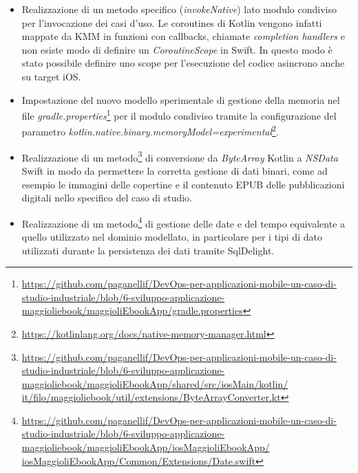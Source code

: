 \begin{itemize}
    \item Realizzazione di un metodo specifico (\textit{invokeNative}) lato modulo condiviso per l'invocazione dei casi d'uso. Le coroutines di Kotlin vengono infatti mappate da KMM in funzioni con callbacks, chiamate \textit{completion handlers} e non esiste modo di definire un \textit{CoroutineScope} in Swift. In questo modo è stato possibile definire uno scope per l'esecuzione del codice asincrono anche su target iOS.
    \item Impostazione del nuovo modello sperimentale di gestione della memoria nel file \textit{gradle.properties}\footnote{\href{https://github.com/paganellif/DevOps-per-applicazioni-mobile-un-caso-di-studio-industriale/blob/6-sviluppo-applicazione-maggioliebook/maggioliEbookApp/gradle.properties}{https://github.com/paganellif/DevOps-per-applicazioni-mobile-un-caso-di-studio-industriale/blob/6-sviluppo-applicazione-maggioliebook/maggioliEbookApp/gradle.properties}} per il modulo condiviso tramite la configurazione del parametro \textit{kotlin.native.binary.memoryModel=experimental}\footnote{\href{https://kotlinlang.org/docs/native-memory-manager.html}{https://kotlinlang.org/docs/native-memory-manager.html}}.
    \item Realizzazione di un metodo\footnote{\href{https://github.com/paganellif/DevOps-per-applicazioni-mobile-un-caso-di-studio-industriale/blob/6-sviluppo-applicazione-maggioliebook/maggioliEbookApp/shared/src/iosMain/kotlin/it/filo/maggioliebook/util/extensions/ByteArrayConverter.kt}{https://github.com/paganellif/DevOps-per-applicazioni-mobile-un-caso-di-studio-industriale/blob/6-sviluppo-applicazione-maggioliebook/maggioliEbookApp/shared/src/iosMain/kotlin/\\it/filo/maggioliebook/util/extensions/ByteArrayConverter.kt}} di conversione da \textit{ByteArray} Kotlin a \textit{NSData} Swift in modo da permettere la corretta gestione di dati binari, come ad esempio le immagini delle copertine e il contenuto EPUB delle pubblicazioni digitali nello specifico del caso di studio.
    \item Realizzazione di un metodo\footnote{\href{https://github.com/paganellif/DevOps-per-applicazioni-mobile-un-caso-di-studio-industriale/blob/6-sviluppo-applicazione-maggioliebook/maggioliEbookApp/iosMaggioliEbookApp/iosMaggioliEbookApp/Common/Extensions/Date.swift}{https://github.com/paganellif/DevOps-per-applicazioni-mobile-un-caso-di-studio-industriale/blob/6-sviluppo-applicazione-maggioliebook/maggioliEbookApp/iosMaggioliEbookApp/\\iosMaggioliEbookApp/Common/Extensions/Date.swift}} di gestione delle date e del tempo equivalente a quello utilizzato nel dominio modellato, in particolare per i tipi di dato utilizzati durante la persistenza dei dati tramite SqlDelight.

\end{itemize}
